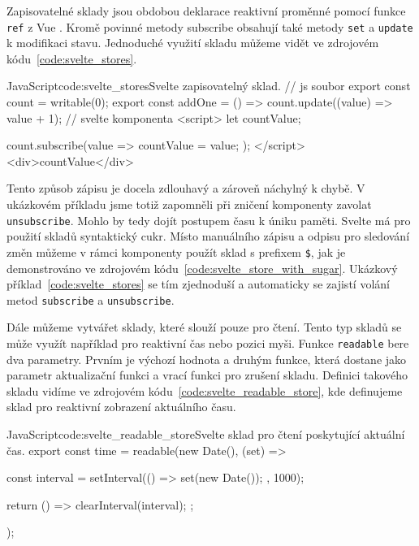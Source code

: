 \documentclass[
  master,
  program=ainf,
  tables=false,
  sourcecodes,
  glossaries,
  index
]{kidiplom}
\begin{document}
Zapisovatelné sklady jsou obdobou deklarace reaktivní proměnné pomocí funkce {\tt ref} z Vue \cite{vue}. Kromě povinné metody
subscribe obsahují také metody {\tt set} a {\tt update} k modifikaci stavu. Jednoduché využití skladu můžeme vidět
ve zdrojovém kódu~\ref{code:svelte_stores}.

  \begin{kicode}{JavaScript}{code:svelte_stores}{Svelte zapisovatelný sklad.}
    // js soubor
    export const count = writable(0);
    export const addOne = () => count.update((value) => value + 1);
    // svelte komponenta
    <script>
      let countValue;

      count.subscribe(value => {
        countValue = value;
      });
    </script>
    <div>{countValue}</div>
  \end{kicode}

Tento způsob zápisu je docela zdlouhavý a zároveň náchylný k chybě. V ukázkovém příkladu jsme totiž zapomněli
při zničení komponenty zavolat \\{\tt unsubscribe}. Mohlo by tedy dojít postupem času k úniku paměti. Svelte \cite{svelte} má pro
použití skladů syntaktický cukr. Místo manuálního zápisu a odpisu pro sledování změn můžeme v rámci komponenty
použít sklad s prefixem {\tt \$}, jak je demonstrováno ve zdrojovém kódu~\ref{code:svelte_store_with_sugar}.
Ukázkový příklad~\ref{code:svelte_stores} se tím zjednoduší a automaticky se zajistí volání metod {\tt subscribe} a {\tt unsubscribe}.


Dále můžeme vytvářet sklady, které slouží pouze pro čtení. Tento typ skladů se může využít například pro
reaktivní čas nebo pozici myši. Funkce {\tt readable} bere dva parametry. Prvním je výchozí hodnota a druhým funkce,
která dostane jako parametr aktualizační funkci a vrací funkci pro zrušení skladu. Definici takového skladu
vidíme ve zdrojovém kódu~\ref{code:svelte_readable_store}, kde definujeme sklad pro reaktivní zobrazení aktuálního času.

\begin{absolutelynopagebreak}
  \begin{kicode}{JavaScript}{code:svelte_readable_store}{Svelte sklad pro čtení poskytující aktuální čas.}
    export const time = readable(new Date(), (set) => {
      const interval = setInterval(() => {
        set(new Date());
      }, 1000);

      return () => {
        clearInterval(interval);
      };
    });
  \end{kicode}
\end{absolutelynopagebreak}
\end{document}
